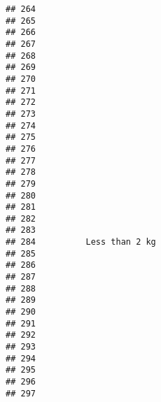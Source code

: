 \documentclass[
]{article}
\begin{document}
\begin{verbatim}
## 264                                                                       
## 265                                                                       
## 266                                                                       
## 267                                                                       
## 268                                                                       
## 269                                                                       
## 270                                                                       
## 271                                                                       
## 272                                                                       
## 273                                                                       
## 274                                                                       
## 275                                                                       
## 276                                                                       
## 277                                                                       
## 278                                                                       
## 279                                                                       
## 280                                                                       
## 281                                                                       
## 282                                                                       
## 283                                                                       
## 284          Less than 2 kg                                               
## 285                                                                       
## 286                                                                       
## 287                                                                       
## 288                                                                       
## 289                                                                       
## 290                                                                       
## 291                                                                       
## 292                                                                       
## 293                                                                       
## 294                                                                       
## 295                                                                       
## 296                                                                       
## 297                                                                       

\end{verbatim}
\end{document}
